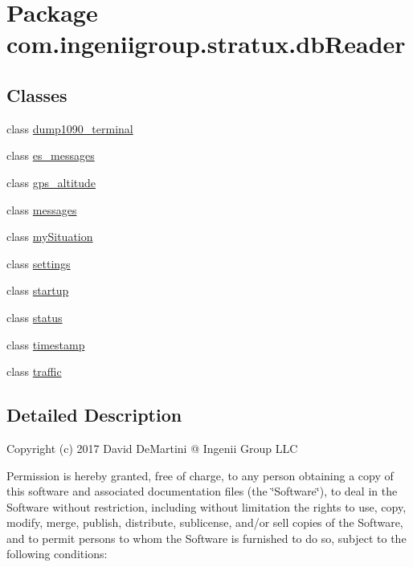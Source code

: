\hypertarget{namespacecom_1_1ingeniigroup_1_1stratux_1_1db_reader}{}\section{Package com.\+ingeniigroup.\+stratux.\+db\+Reader}
\label{namespacecom_1_1ingeniigroup_1_1stratux_1_1db_reader}
\subsection*{Classes}
\begin{DoxyCompactItemize}
\item 
class \hyperlink{classcom_1_1ingeniigroup_1_1stratux_1_1db_reader_1_1dump1090__terminal}{dump1090\+\_\+terminal}
\item 
class \hyperlink{classcom_1_1ingeniigroup_1_1stratux_1_1db_reader_1_1es__messages}{es\+\_\+messages}
\item 
class \hyperlink{classcom_1_1ingeniigroup_1_1stratux_1_1db_reader_1_1gps__altitude}{gps\+\_\+altitude}
\item 
class \hyperlink{classcom_1_1ingeniigroup_1_1stratux_1_1db_reader_1_1messages}{messages}
\item 
class \hyperlink{classcom_1_1ingeniigroup_1_1stratux_1_1db_reader_1_1my_situation}{my\+Situation}
\item 
class \hyperlink{classcom_1_1ingeniigroup_1_1stratux_1_1db_reader_1_1settings}{settings}
\item 
class \hyperlink{classcom_1_1ingeniigroup_1_1stratux_1_1db_reader_1_1startup}{startup}
\item 
class \hyperlink{classcom_1_1ingeniigroup_1_1stratux_1_1db_reader_1_1status}{status}
\item 
class \hyperlink{classcom_1_1ingeniigroup_1_1stratux_1_1db_reader_1_1timestamp}{timestamp}
\item 
class \hyperlink{classcom_1_1ingeniigroup_1_1stratux_1_1db_reader_1_1traffic}{traffic}
\end{DoxyCompactItemize}


\subsection{Detailed Description}
Copyright (c) 2017 David De\+Martini @ Ingenii Group L\+LC

Permission is hereby granted, free of charge, to any person obtaining a copy of this software and associated documentation files (the \char`\"{}\+Software\char`\"{}), to deal in the Software without restriction, including without limitation the rights to use, copy, modify, merge, publish, distribute, sublicense, and/or sell copies of the Software, and to permit persons to whom the Software is furnished to do so, subject to the following conditions\+:

